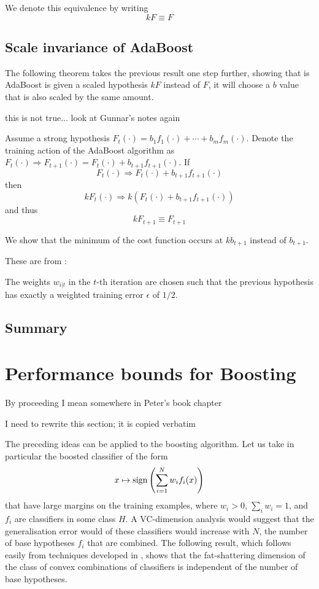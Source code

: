 We denote this equivalence by writing
\[
kF \equiv F
\]


\subsection{Scale invariance of AdaBoost}

The following theorem takes the previous result one step further,
showing that is AdaBoost is given a scaled hypothesis $kF$ instead of
$F$, it will choose a $b$ value that is also scaled by the same
amount.

this is not true... look at Gunnar's notes again

\begin{theorem}
Assume a strong hypothesis $F_t(\cdot) = b_1 f_1(\cdot) + \cdots + b_m
f_m(\cdot)$.  Denote the training action of the AdaBoost algorithm as
$F_t(\cdot) \Rightarrow F_{t+1}(\cdot) = F_t(\cdot) +
b_{t+1}f_{t+1}(\cdot)$.  If
\[
	F_t(\cdot) \Rightarrow F_t(\cdot) + b_{t+1}f_{t+1}(\cdot)
\]
then
\[
	kF_t(\cdot) \Rightarrow k\left( F_t(\cdot) +
	b_{t+1}f_{t+1}(\cdot) \right)
\]
and thus
\[
	kF_{t+1} \equiv F_{t+1}
\]

\proof We show that the minimum of the cost function occurs at
$kb_{t+1}$ instead of $b_{t+1}$.
\end{theorem}



These are from \cite{Ratsch98}:

\begin{theorem}
The weights $w_{i|t}$ in the $t$-th iteration are chosen such that the
previous hypothesis has exactly a weighted training error $\epsilon$
of $1/2$.
\end{theorem}

\subsection{Summary}


\section{Performance bounds for Boosting}
By proceeding I mean somewhere in Peter's book chapter

I need to rewrite this section; it is copied verbatim

The preceding ideas can be applied to the boosting algorithm.  Let us
take in particular the boosted classifier of the form
\begin{equation}
x \mapsto \mathrm{sign} \left( \sum_{i=1}^{N} w_i f_i(x) \right)
\end{equation}
that have large margins on the training examples, where $w_i > 0$,
$\sum_i w_i = 1$, and $f_i$ are classifiers in some class $H$.  A
VC-dimension analysis would suggest that the generalisation error
would of these classifiers would increase with $N$, the number of base
hypotheses $f_i$ that are combined.  The following result, which
follows easily from techniques developed in \cite{Bartlett98}, shows
that the fat-shattering dimension of the class of convex combinations
of classifiers is independent of the number of base hypotheses.

